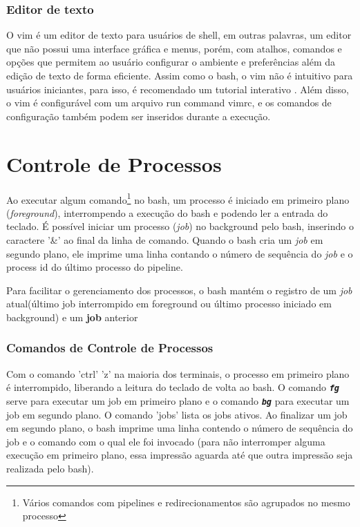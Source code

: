 \documentclass[oneside, 11 pt]{article}
\begin{document}
	\section{Editor de texto}
	O vim é um editor de texto para usuários de shell, em outras palavras, um editor que não possui uma interface gráfica e menus, porém, com atalhos, comandos e opções que permitem ao usuário configurar o ambiente e preferências além da edição de texto de forma eficiente. Assim como o bash, o vim não é intuitivo para usuários iniciantes, para isso, é recomendado um tutorial interativo \cite{vimt}. Além disso, o vim é configurável com um arquivo run command vimrc, e os comandos de configuração também podem ser inseridos durante a execução.
	
	\pagebreak
	\part{Controle de Processos}
	Ao executar algum comando\footnote{Vários comandos com pipelines e redirecionamentos são agrupados no mesmo processo} no bash, um processo é iniciado em primeiro plano (\textit{foreground}), interrompendo a execução do bash e podendo ler a entrada do teclado. É possível iniciar um processo (\textit{job}) no background pelo bash, inserindo o caractere '\&' ao final da linha de comando. Quando o bash cria um \textit{job} em segundo plano, ele imprime uma linha contando o número de sequência do \textit{job} e o process id do último processo do pipeline.
	
	Para facilitar o gerenciamento dos processos, o bash mantém o registro de um \textit{job} atual(último job interrompido em foreground ou último processo iniciado em background) e um \textbf{job} anterior
	
	\section{Comandos de Controle de Processos}	
	Com o comando 'ctrl' 'z' na maioria dos terminais, o processo em primeiro plano é interrompido, liberando a leitura do teclado de volta ao bash. O comando \texttt{\textbf{\textit{fg}}} serve para executar um job em primeiro plano e o comando \texttt{\textbf{\textit{bg}}} para executar um job em segundo plano. O comando 'jobs' lista os jobs ativos. Ao finalizar um job em segundo plano, o bash imprime uma linha contendo o número de sequência do job e o comando com o qual ele foi invocado (para não interromper alguma execução em primeiro plano, essa impressão aguarda até que outra impressão seja realizada pelo bash).
	 
\end{document}
